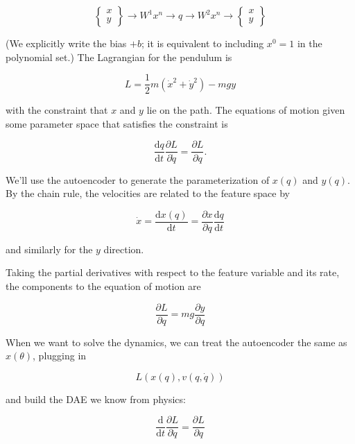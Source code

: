 \documentclass[]{article}
\begin{document}
\[\left\{\begin{array}{c} x\\y\end{array}\right\}
\rightarrow W^1 x^n \rightarrow q \rightarrow W^2 x^n \rightarrow 
\left\{\begin{array}{c} x\\y\end{array}\right\}\]

(We explicitly write the bias \(+b\); it is equivalent to including
\(x^0=1\) in the polynomial set.) The Lagrangian for the pendulum is

\begin{equation}
L = \frac{1}{2}m\left(\dot{x}^2 + \dot{y}^2\right) - m g y
\end{equation}

with the constraint that \(x\) and \(y\) lie on the path. The equations
of motion given some parameter space that satisfies the constraint is

\begin{equation}
\frac{\mathrm{d}q}{\mathrm{d}t}\frac{\partial L}{\partial \dot{q}} = \frac{\partial L}{\partial q}.
\end{equation}

We'll use the autoencoder to generate the parameterization of \(x(q)\)
and \(y(q)\). By the chain rule, the velocities are related to the
feature space by

\begin{equation}
\dot{x} = \frac{\mathrm{d}x(q)}{\mathrm{d}t} = \frac{\partial x}{\partial q}\frac{\mathrm{d}q}{\mathrm{d}t}
\end{equation}

and similarly for the \(y\) direction.

Taking the partial derivatives with respect to the feature variable and
its rate, the components to the equation of motion are

\begin{equation}
\frac{\partial L}{\partial q} = m g \frac{\partial y}{\partial q}
\end{equation}

When we want to solve the dynamics, we can treat the autoencoder the
same as \(x(\theta)\), plugging in

\[L(x(q),v(q,\dot{q}))\]

and build the DAE we know from physics:

\[\frac{\mathrm{d}}{\mathrm{d}t}\frac{\partial L}{\partial \dot{q}} = \frac{\partial L}{\partial q}\]
\end{document}
